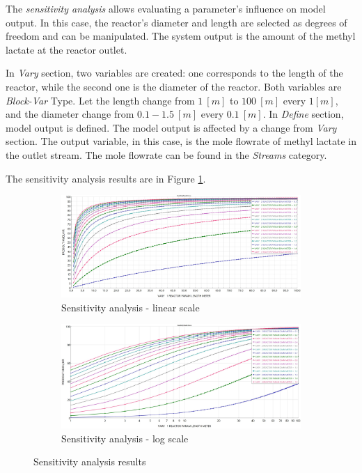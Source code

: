 The \textit{sensitivity analysis} allows evaluating a parameter's influence on model output. In this case, the reactor's diameter and length are selected as degrees of freedom and can be manipulated. The system output is the amount of the methyl lactate at the reactor outlet.

In \textit{Vary} section, two variables are created: one corresponds to the length of the reactor, while the second one is the diameter of the reactor. Both variables are \textit{Block-Var} Type. Let the length change from $1~[m]$ to $100~[m]$ every $1[m]$, and the diameter change from $0.1-1.5~[m]$ every $0.1~[m]$.
In \textit{Define} section, model output is defined. The model output is affected by a change from \textit{Vary} section. The output variable, in this case, is the mole flowrate of methyl lactate in the outlet stream. The mole flowrate can be found in the \textit{Streams} category.

The sensitivity analysis results are in Figure \ref{fig:Ester_Sensitivity_Analysis}.

\begin{figure}[h!]
	\centering
	\begin{subfigure}[b]{0.99\textwidth}
		\centering
		\includegraphics[width=\textwidth]{Figures/Proces_Analysis/Parametric_sensitivity_analysis.jpg}
		\caption{Sensitivity analysis - linear scale}
	\end{subfigure}
	\begin{subfigure}[b]{0.99\textwidth}
		\centering
		\includegraphics[width=\textwidth]{Figures/Proces_Analysis/Parametric_sensitivity_analysis_inverse.jpg}
		\caption{Sensitivity analysis - log scale}
	\end{subfigure}
	\caption{Sensitivity analysis results}
	\label{fig:Ester_Sensitivity_Analysis}
\end{figure}

